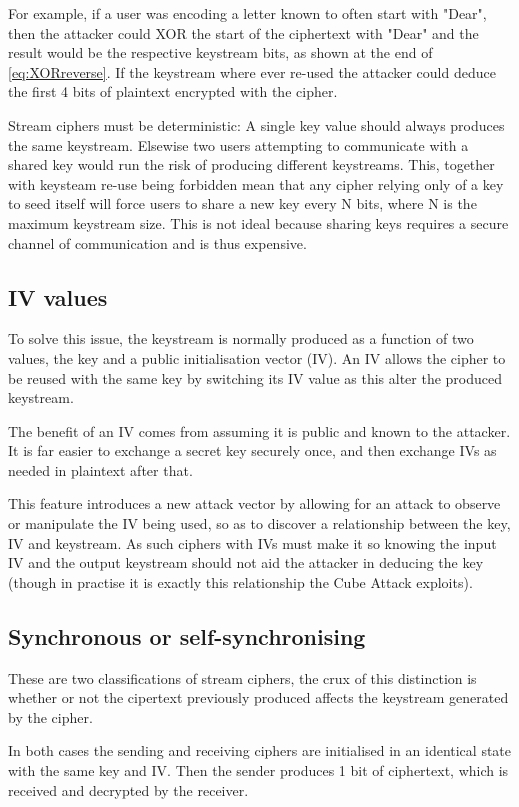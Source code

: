 \documentclass{report}
\let\Oldsubsection\subsection
\renewcommand{\subsection}{\FloatBarrier\Oldsubsection}
\begin{document}
For example, if a user was encoding a letter known to often start with "Dear", then the attacker could XOR the start of the ciphertext with "Dear" and the result would be the respective keystream bits, as shown at the end of \ref{eq:XORreverse}. If the keystream where ever re-used the attacker could deduce the first 4 bits of plaintext encrypted with the cipher.

Stream ciphers must be deterministic: A single key value should always produces the same keystream. Elsewise two users attempting to communicate with a shared key would run the risk of producing different keystreams. This, together with keysteam re-use being forbidden mean that any cipher relying only of a key to seed itself will force users to share a new key every N bits, where N is the maximum keystream size. This is not ideal because sharing keys requires a secure channel of communication and is thus expensive.

\subsection*{IV values}
To solve this issue, the keystream is normally produced as a function of two values, the key and a public initialisation vector (IV). An IV allows the cipher to be reused with the same key by switching its IV value as this alter the produced keystream.

The benefit of an IV comes from assuming it is public and known to the attacker. It is far easier to exchange a secret key securely once, and then exchange IVs as needed in plaintext after that.

This feature introduces a new attack vector by allowing for an attack to observe or manipulate the IV being used, so as to discover a relationship between the key, IV and keystream. As such ciphers with IVs must make it so knowing the input IV and the output keystream should not aid the attacker in deducing the key (though in practise it is exactly this relationship the Cube Attack exploits).

\subsection{Synchronous or self-synchronising}
These are two classifications of stream ciphers, the crux of this distinction is whether or not the cipertext previously produced affects the keystream generated by the cipher\cite{selfSyncCipher}.

In both cases the sending and receiving ciphers are initialised in an identical state with the same key and IV. Then the sender produces 1 bit of ciphertext, which is received and decrypted by the receiver.
\end{document}
